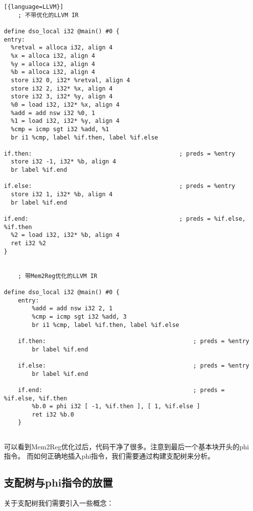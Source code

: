 \begin{lstlisting}[{language=LLVM}]
    ; 不带优化的LLVM IR
    
define dso_local i32 @main() #0 {
entry:
  %retval = alloca i32, align 4
  %x = alloca i32, align 4
  %y = alloca i32, align 4
  %b = alloca i32, align 4
  store i32 0, i32* %retval, align 4
  store i32 2, i32* %x, align 4
  store i32 3, i32* %y, align 4
  %0 = load i32, i32* %x, align 4
  %add = add nsw i32 %0, 1
  %1 = load i32, i32* %y, align 4
  %cmp = icmp sgt i32 %add, %1
  br i1 %cmp, label %if.then, label %if.else

if.then:                                          ; preds = %entry
  store i32 -1, i32* %b, align 4
  br label %if.end

if.else:                                          ; preds = %entry
  store i32 1, i32* %b, align 4
  br label %if.end

if.end:                                           ; preds = %if.else, %if.then
  %2 = load i32, i32* %b, align 4
  ret i32 %2
}


    ; 带Mem2Reg优化的LLVM IR

define dso_local i32 @main() #0 {
    entry:
        %add = add nsw i32 2, 1
        %cmp = icmp sgt i32 %add, 3
        br i1 %cmp, label %if.then, label %if.else
    
    if.then:                                          ; preds = %entry
        br label %if.end
    
    if.else:                                          ; preds = %entry
        br label %if.end
    
    if.end:                                           ; preds = %if.else, %if.then
        %b.0 = phi i32 [ -1, %if.then ], [ 1, %if.else ]
        ret i32 %b.0
    }
        
\end{lstlisting}
可以看到Mem2Reg优化过后，代码干净了很多。注意到最后一个基本块开头的phi指令。
而如何正确地插入phi指令，我们需要通过构建支配树来分析。
\subsection{支配树与phi指令的放置}
关于支配树我们需要引入一些概念：


